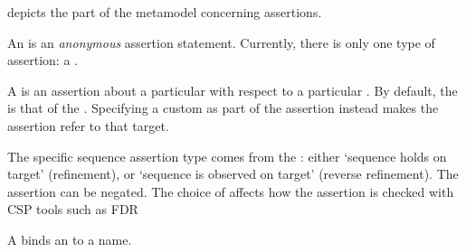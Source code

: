  depicts the part of the metamodel concerning
assertions.

An \massertion{} is an \emph{anonymous} assertion statement.  Currently, there is
only one type of assertion: a \msequenceassertion{}.  

A \msequenceassertion{} is an assertion about a particular \msequence{} with
respect to a particular \mtarget.  By default, the \mtarget{} is that of the
\msequence{}.   Specifying a
custom \mtarget{} as part of the assertion instead makes the assertion refer
to that target.

The specific sequence assertion type comes from the \msequenceassertiontype:
either `sequence holds on target' (refinement), or `sequence is observed on
target' (reverse refinement).  The assertion can be negated.  The choice of
\mcspmodel{} affects how the assertion is checked with CSP tools such as FDR

A \mnamedassertion{} binds an \massertion{} to a name.
